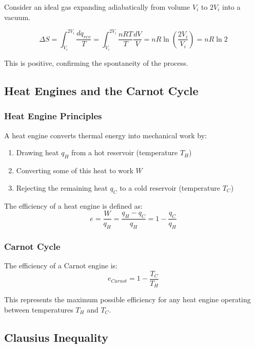 \documentclass{article}
\theoremstyle{definition}
\begin{document}
Consider an ideal gas expanding adiabatically from volume $V_i$ to $2V_i$ into a vacuum.

\begin{equation}
\Delta S = \int_{V_i}^{2V_i} \frac{dq_{rev}}{T} = \int_{V_i}^{2V_i} \frac{nRT}{T} \frac{dV}{V} = nR \ln\left(\frac{2V_i}{V_i}\right) = nR \ln 2
\end{equation}

This is positive, confirming the spontaneity of the process.

\subsection{Heat Engines and the Carnot Cycle}

\subsubsection{Heat Engine Principles}

A heat engine converts thermal energy into mechanical work by:
\begin{enumerate}
    \item Drawing heat $q_H$ from a hot reservoir (temperature $T_H$)
    \item Converting some of this heat to work $W$
    \item Rejecting the remaining heat $q_C$ to a cold reservoir (temperature $T_C$)
\end{enumerate}

The efficiency of a heat engine is defined as:
\begin{equation}
e = \frac{W}{q_H} = \frac{q_H - q_C}{q_H} = 1 - \frac{q_C}{q_H}
\end{equation}

\subsubsection{Carnot Cycle}

The efficiency of a Carnot engine is:
\begin{equation}
e_{Carnot} = 1 - \frac{T_C}{T_H}
\end{equation}

This represents the maximum possible efficiency for any heat engine operating between temperatures $T_H$ and $T_C$.

\subsection{Clausius Inequality}
\end{document}
